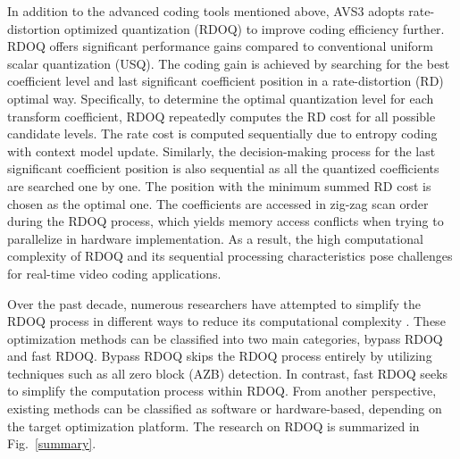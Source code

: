 \documentclass[lettersize,journal]{IEEEtran}
\begin{document}
\IEEEpubidadjcol

In addition to the advanced coding tools mentioned above, AVS3 adopts rate-distortion optimized quantization (RDOQ) to improve coding efficiency further. RDOQ offers significant performance gains compared to conventional uniform scalar quantization (USQ). The coding gain is achieved by searching for the best coefficient level and last significant coefficient position in a rate-distortion (RD) optimal way. Specifically, to determine the optimal quantization level for each transform coefficient, RDOQ repeatedly computes the RD cost for all possible candidate levels. The rate cost is computed sequentially due to entropy coding with context model update. Similarly, the decision-making process for the last significant coefficient position is also sequential as all the quantized coefficients are searched one by one. The position with the minimum summed RD cost is chosen as the optimal one. The coefficients are accessed in zig-zag scan order during the RDOQ process, which yields memory access conflicts when trying to parallelize in hardware implementation. As a result, the high computational complexity of RDOQ and its sequential processing characteristics pose challenges for real-time video coding applications. 

Over the past decade, numerous researchers have attempted to simplify the RDOQ process in different ways to reduce its computational complexity \cite{yin2014fasttrellis, wang2017fast, yin2019efficient, wang2021trellis}. These optimization methods can be classified into two main categories, bypass RDOQ and fast RDOQ. Bypass RDOQ skips the RDOQ process entirely by utilizing techniques such as all zero block (AZB) detection. In contrast, fast RDOQ seeks to simplify the computation process within RDOQ. From another perspective, existing methods can be classified as software or hardware-based, depending on the target optimization platform. The research on RDOQ is summarized in Fig.~\ref{summary}. 
\end{document}

